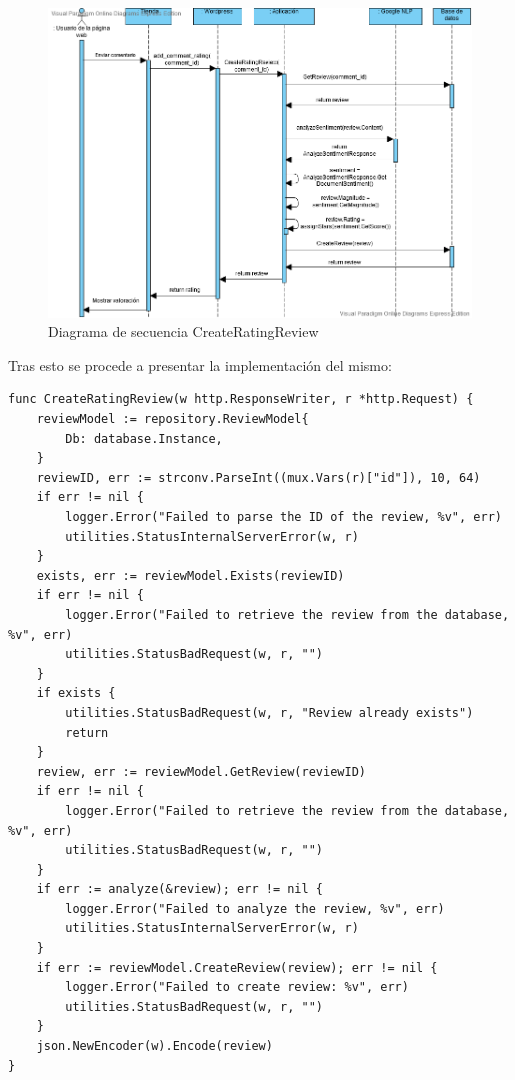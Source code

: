 \begin{figure}[ht]
	\begin{center}
		\includegraphics[width = 1\textwidth]{Figuras/DiagramaSecuencia.png}
	\end{center}
	\caption{\label{fig:sequenceDiagram} Diagrama de secuencia CreateRatingReview}
\end{figure}
\newpage
Tras esto se procede a presentar la implementación del mismo:
\begin{lstlisting}[caption= M\'etodo para crear una valoraci\'on de un comentario]
func CreateRatingReview(w http.ResponseWriter, r *http.Request) {
	reviewModel := repository.ReviewModel{
		Db: database.Instance,
	}
	reviewID, err := strconv.ParseInt((mux.Vars(r)["id"]), 10, 64)
	if err != nil {
		logger.Error("Failed to parse the ID of the review, %v", err)
		utilities.StatusInternalServerError(w, r)
	}
	exists, err := reviewModel.Exists(reviewID)
	if err != nil {
		logger.Error("Failed to retrieve the review from the database, %v", err)
		utilities.StatusBadRequest(w, r, "")
	}
	if exists {
		utilities.StatusBadRequest(w, r, "Review already exists")
		return
	}
	review, err := reviewModel.GetReview(reviewID)
	if err != nil {
		logger.Error("Failed to retrieve the review from the database, %v", err)
		utilities.StatusBadRequest(w, r, "")
	}
	if err := analyze(&review); err != nil {
		logger.Error("Failed to analyze the review, %v", err)
		utilities.StatusInternalServerError(w, r)
	}
	if err := reviewModel.CreateReview(review); err != nil {
		logger.Error("Failed to create review: %v", err)
		utilities.StatusBadRequest(w, r, "")
	}
	json.NewEncoder(w).Encode(review)
}
\end{lstlisting}

